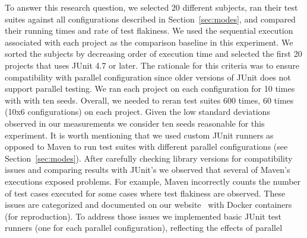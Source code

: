 To answer this research question, we selected 20 different subjects,
ran their test suites against all configurations described in
Section~\ref{sec:modes}, and compared their running times and rate of
test flakiness.
We used the sequential execution associated with each project as the
comparison baseline in this experiment.
We sorted the subjects by decreasing order of execution time and
selected the first 20 projects that uses JUnit 4.7 or later.
The rationale for this criteria was to ensure compatibility with
parallel configuration since older versions of JUnit does not support
parallel testing.
We ran each project on each configuration for 10 times with with ten seeds.
Overall, we needed to reran test suites 600 times, 60 times (10x6
configurations) on each project.
Given the low standard deviations observed in our measurements we
consider ten seeds reasonable for this experiment.
It is worth mentioning that we used custom JUnit runners as opposed to
Maven to run test suites with different parallel configurations (see
Section~\ref{sec:modes}).
After carefully checking library versions for compatibility issues and
comparing results with JUnit's we observed that several of Maven's
executions exposed problems.  For example, Maven incorrectly counts
the number of test cases executed for some cases where test flakiness
are observed.  These issues are categorized and documented on our
website~\cite{ourwebpage} with Docker containers (for reproduction).
To address those issues we implemented basic JUnit test runners (one
for each parallel configuration), reflecting the effects of parallel
